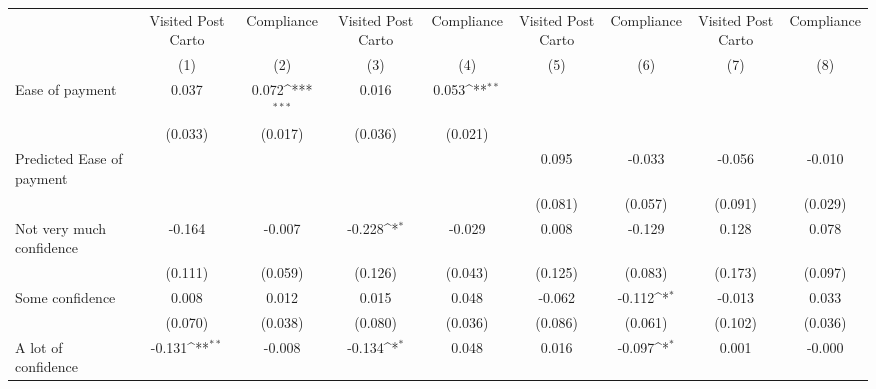 {
\def\sym#1{\ifmmode^{#1}\else\(^{#1}\)\fi}
\begin{tabular}{l*{8}{c}}
\hline\hline
                &\multicolumn{1}{c}{Visited Post Carto}&\multicolumn{1}{c}{Compliance}&\multicolumn{1}{c}{Visited Post Carto}&\multicolumn{1}{c}{Compliance}&\multicolumn{1}{c}{Visited Post Carto}&\multicolumn{1}{c}{Compliance}&\multicolumn{1}{c}{Visited Post Carto}&\multicolumn{1}{c}{Compliance}\\
                &\multicolumn{1}{c}{(1)}         &\multicolumn{1}{c}{(2)}         &\multicolumn{1}{c}{(3)}         &\multicolumn{1}{c}{(4)}         &\multicolumn{1}{c}{(5)}         &\multicolumn{1}{c}{(6)}         &\multicolumn{1}{c}{(7)}         &\multicolumn{1}{c}{(8)}         \\
\hline
Ease of payment &    0.037         &    0.072\sym{***}&    0.016         &    0.053\sym{**} &                  &                  &                  &                  \\
                &  (0.033)         &  (0.017)         &  (0.036)         &  (0.021)         &                  &                  &                  &                  \\
Predicted Ease of payment&                  &                  &                  &                  &    0.095         &   -0.033         &   -0.056         &   -0.010         \\
                &                  &                  &                  &                  &  (0.081)         &  (0.057)         &  (0.091)         &  (0.029)         \\
Not very much confidence&   -0.164         &   -0.007         &   -0.228\sym{*}  &   -0.029         &    0.008         &   -0.129         &    0.128         &    0.078         \\
                &  (0.111)         &  (0.059)         &  (0.126)         &  (0.043)         &  (0.125)         &  (0.083)         &  (0.173)         &  (0.097)         \\
Some confidence &    0.008         &    0.012         &    0.015         &    0.048         &   -0.062         &   -0.112\sym{*}  &   -0.013         &    0.033         \\
                &  (0.070)         &  (0.038)         &  (0.080)         &  (0.036)         &  (0.086)         &  (0.061)         &  (0.102)         &  (0.036)         \\
A lot of confidence&   -0.131\sym{**} &   -0.008         &   -0.134\sym{*}  &    0.048         &    0.016         &   -0.097\sym{*}  &    0.001         &   -0.000         \\

\end{tabular}}
